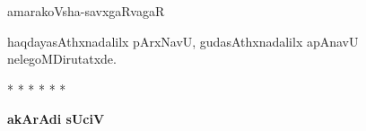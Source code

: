 {\hfill amarakoVsha-savxgaRvagaR

\smallskip
haqdayasAthxnadalilx pArxNavU, gudasAthxnadalilx apAnavU nelegoMDirutatxde.

\begin{center}
* * * * * *
\end{center}

\newpage

\begin{center}
\textbf{\Large akArAdi sUciV}
\end{center}






}

